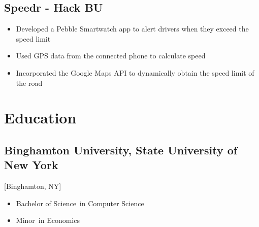 \documentclass{mycv}
\begin{document}
\subsection{Speedr - Hack BU}
\begin{itemize}
  \item Developed a Pebble Smartwatch app to alert drivers when they exceed the speed limit
  \item Used GPS data from the connected phone to calculate speed
  \item Incorporated the Google Maps API to dynamically obtain the speed limit of the road   
\end{itemize}

\section{Education}

\subsection{Binghamton University, State University of New York}[Binghamton, NY]
\vspace{-\parskip}%
\begin{itemize}[label={}]
  \item Bachelor of Science\ in Computer Science 
  \item Minor\ in Economics
\end{itemize}
\end{document}
